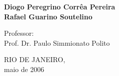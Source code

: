 \documentclass[12pt,portuguese,a4paper,pdftex]{article}
\renewcommand{\baselinestretch}{1.5}
\begin{document}
\pagestyle{empty}

\hspace{-6mm}{\large \sc Mestrado em Oceanografia Física - IOUSP\\
IOF 850 - Oceanografia Observacional\\
Lista 1 - Análise de Séries Temporais\\}


\vspace{6cm}

\begin{center}
{\large \bf Diogo Peregrino Corrêa Pereira\\
Rafael Guarino Soutelino\\} 
\end{center}

\vspace{5cm}

\begin{center}
{Professor:\\
Prof. Dr. Paulo Simmionato Polito}
\end{center}

\vspace{2cm}

\begin{center}
{\small RIO DE JANEIRO, \\
maio de 2006}
\end{center}


\newpage
{}
\renewcommand{\baselinestretch}{1}

\pagestyle{empty}
\setcounter{page}{1}
\end{document}
